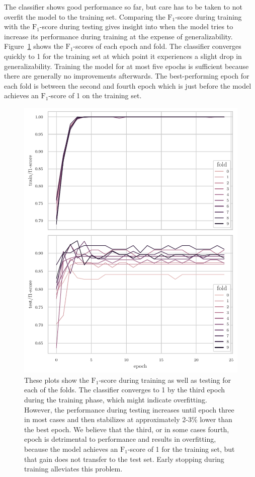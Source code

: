 \documentclass[draft,final]{vutinfth} %
\begin{document}
The classifier shows good performance so far, but care has to be taken
to not overfit the model to the training set. Comparing the
$\mathrm{F}_1$-score during training with the $\mathrm{F}_1$-score
during testing gives insight into when the model tries to increase its
performance during training at the expense of
generalizability. Figure~\ref{fig:classifier-hyp-folds} shows the
$\mathrm{F}_1$-scores of each epoch and fold. The classifier converges
quickly to 1 for the training set at which point it experiences a
slight drop in generalizability. Training the model for at most five
epochs is sufficient because there are generally no improvements
afterwards. The best-performing epoch for each fold is between the
second and fourth epoch which is just before the model achieves an
$\mathrm{F}_1$-score of 1 on the training set.

\begin{figure}
  \centering
  \includegraphics[width=.9\textwidth]{graphics/classifier-hyp-folds-f1.pdf}
  \caption[$\mathrm{F}_1$-score of stratified $10$-fold cross
  validation.]{These plots show the $\mathrm{F}_1$-score during
    training as well as testing for each of the folds. The classifier
    converges to 1 by the third epoch during the training phase, which
    might indicate overfitting. However, the performance during
    testing increases until epoch three in most cases and then
    stabilizes at approximately 2-3\% lower than the best epoch. We
    believe that the third, or in some cases fourth, epoch is
    detrimental to performance and results in overfitting, because the
    model achieves an $\mathrm{F}_1$-score of 1 for the training set,
    but that gain does not transfer to the test set. Early stopping
    during training alleviates this problem.}
  \label{fig:classifier-hyp-folds}
\end{figure}
\end{document}
